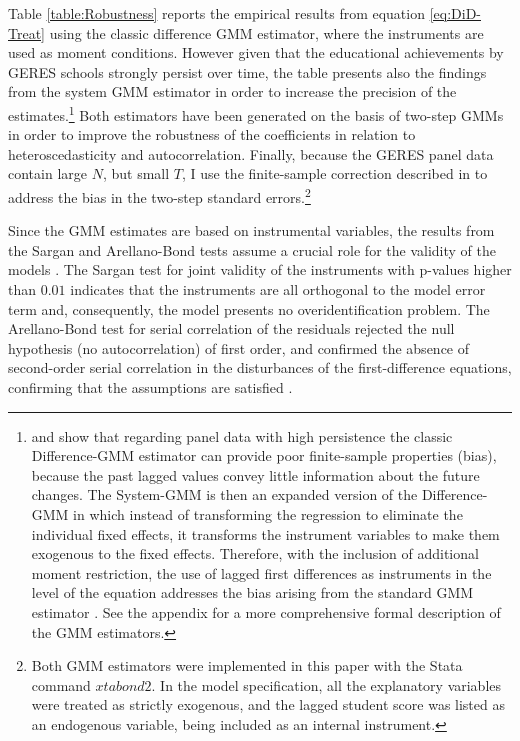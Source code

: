 \documentclass[a4paper, 12pt]{article}
\begin{document}
{Table \ref{table:Robustness} reports the empirical results from equation \eqref{eq:DiD-Treat} using the classic  \citet{arellano1991some} difference GMM estimator, where the instruments are used as moment conditions. However given that the educational achievements by GERES schools strongly persist over time, the table presents also the findings from the \citet{blundell1998initial} system GMM estimator in order to increase the precision of the estimates.\footnote{\citet{blundell1998initial} and \citet{arellano1995another} show that regarding panel data with high persistence the classic Difference-GMM estimator can provide poor finite-sample properties (bias), because the past lagged values convey little information about the future changes. The System-GMM is then an expanded version of the Difference-GMM in which instead of transforming the regression to eliminate the individual fixed effects, it transforms the instrument variables to make them exogenous to the fixed effects. Therefore, with the inclusion of additional moment restriction, the use of lagged first differences as instruments in the level of the equation addresses the bias arising from the standard GMM estimator \citep{jessen2018important, roodman2009xtabond2, baltagi2008econometric}. See the appendix for a more comprehensive formal description of the GMM estimators.} Both estimators have been generated on the basis of two-step GMMs in order to improve the robustness of the coefficients in relation to heteroscedasticity and autocorrelation. Finally, because the GERES panel data contain large $N$, but small $T$, I use the finite-sample correction described in \citet{windmeijer2005finite} to address the bias in the two-step standard errors.\footnote{Both GMM estimators were implemented in this paper with the Stata command $xtabond2$. In the model specification, all the explanatory variables were treated as strictly exogenous, and the lagged student score was listed as an endogenous variable, being included as an internal instrument.} 


Since the GMM estimates are based on instrumental variables, the results from the Sargan and Arellano-Bond tests assume a crucial role for the validity of the models \citep{baum2007enhanced}. The Sargan test for joint validity of the instruments with p-values higher than $0.01$ indicates that the instruments are all orthogonal to the model error term and, consequently, the model presents no overidentification problem. The Arellano-Bond test for serial correlation of the residuals rejected the null hypothesis (no autocorrelation) of first order, and confirmed the absence of second-order serial correlation in the disturbances of the first-difference equations, confirming that the \citet{arellano1991some} assumptions are satisfied \citep[see e.g.][]{baltagi2008econometric}.     
 
}
\end{document}
